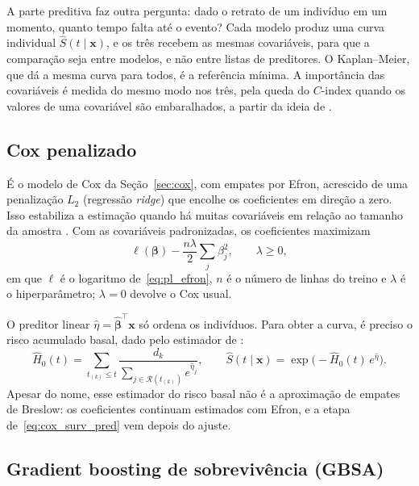 A parte preditiva faz outra pergunta: dado o retrato de um indivíduo em um momento, quanto tempo falta até o evento? Cada modelo produz uma curva individual $\hat{S}(t \mid \mathbf{x})$, e os três recebem as mesmas covariáveis, para que a comparação seja entre modelos, e não entre listas de preditores. O Kaplan--Meier, que dá a mesma curva para todos, é a referência mínima. A importância das covariáveis é medida do mesmo modo nos três, pela queda do $C$-index quando os valores de uma covariável são embaralhados, a partir da ideia de \citet{breiman2001}.

    \subsection{Cox penalizado}
    \label{subsec:cox_preditor}

É o modelo de Cox da Seção~\ref{sec:cox}, com empates por Efron, acrescido de uma penalização $L_2$ (regressão \textit{ridge}) que encolhe os coeficientes em direção a zero. Isso estabiliza a estimação quando há muitas covariáveis em relação ao tamanho da amostra \citep{simon2011}. Com as covariáveis padronizadas, os coeficientes maximizam
\begin{equation}
  \ell(\boldsymbol{\beta}) - \frac{n\lambda}{2} \sum_{j} \beta_j^2, \qquad \lambda \geq 0,
  \label{eq:ridge}
\end{equation}
em que $\ell$ é o logaritmo de~\eqref{eq:pl_efron}, $n$ é o número de linhas do treino e $\lambda$ é o hiperparâmetro; $\lambda = 0$ devolve o Cox usual.

O preditor linear $\hat{\eta} = \hat{\boldsymbol{\beta}}^{\top}\mathbf{x}$ só ordena os indivíduos. Para obter a curva, é preciso o risco acumulado basal, dado pelo estimador de \citet{breslow1972}:
\begin{equation}
  \hat{H}_0(t)=\sum_{t_{(k)}\le t} \frac{d_k}{\sum_{j\in\mathcal{R}(t_{(k)})} e^{\hat{\eta}_j}},
  \qquad
  \hat{S}(t \mid \mathbf{x}) = \exp\bigl(-\hat{H}_0(t)\,e^{\hat{\eta}}\bigr).
  \label{eq:cox_surv_pred}
\end{equation}
Apesar do nome, esse estimador do risco basal não é a aproximação de empates de Breslow: os coeficientes continuam estimados com Efron, e a etapa de~\eqref{eq:cox_surv_pred} vem depois do ajuste.

    \subsection{Gradient boosting de sobrevivência (GBSA)}
    \label{subsec:gbsa}

